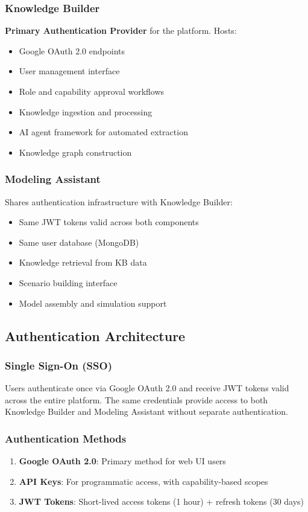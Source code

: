 \documentclass[12pt,a4paper]{article}
\begin{document}
\subsubsection{Knowledge Builder}
\textbf{Primary Authentication Provider} for the platform. Hosts:
\begin{itemize}
    \item Google OAuth 2.0 endpoints
    \item User management interface
    \item Role and capability approval workflows
    \item Knowledge ingestion and processing
    \item AI agent framework for automated extraction
    \item Knowledge graph construction
\end{itemize}

\subsubsection{Modeling Assistant}
Shares authentication infrastructure with Knowledge Builder:
\begin{itemize}
    \item Same JWT tokens valid across both components
    \item Same user database (MongoDB)
    \item Knowledge retrieval from KB data
    \item Scenario building interface
    \item Model assembly and simulation support
\end{itemize}

\subsection{Authentication Architecture}

\subsubsection{Single Sign-On (SSO)}
Users authenticate once via Google OAuth 2.0 and receive JWT tokens valid across the entire platform. The same credentials provide access to both Knowledge Builder and Modeling Assistant without separate authentication.

\subsubsection{Authentication Methods}
\begin{enumerate}
    \item \textbf{Google OAuth 2.0}: Primary method for web UI users
    \item \textbf{API Keys}: For programmatic access, with capability-based scopes
    \item \textbf{JWT Tokens}: Short-lived access tokens (1 hour) + refresh tokens (30 days)
\end{enumerate}
\end{document}
